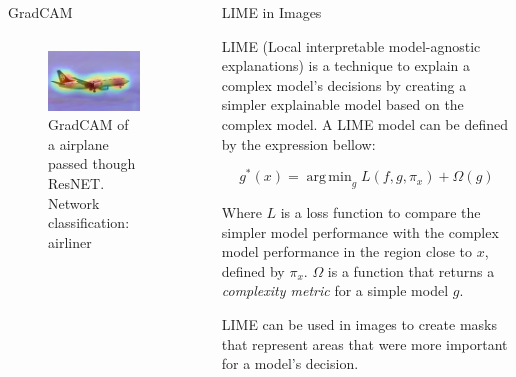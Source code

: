 \documentclass[final]{beamer}
\newlength{\sepwidth}
\newlength{\colwidth}
\newcommand{\separatorcolumn}{\begin{column}{\sepwidth}\end{column}}
\newcommand{\argmin}{\mathop{\mathrm{arg\,min}}}
\begin{document}
\begin{frame}[t]
\begin{columns}[t]
\begin{column}{\colwidth}
\begin{block}{GradCAM}
\begin{columns}
      \begin{column}{0.5\textwidth}
        \begin{figure}
          \centering
          \includegraphics[width=0.9\linewidth]{images/GC_aviao.png}
          \caption{GradCAM of a airplane passed though ResNET. Network classification: airliner}
        \end{figure}
      \end{column}
      
    \end{columns}
  \end{block}
\end{column}

\separatorcolumn

\begin{column}{\colwidth}

  \begin{block}{LIME in Images}

    LIME (Local interpretable model-agnostic explanations) is a technique to explain a complex model's decisions 
    by creating a simpler explainable model based on the complex model. A LIME model can be defined by the expression bellow:
    
    \[g^*(x) = \argmin_{g} L(f, g, \pi_x) + \Omega(g)\]
    
    Where \(L\) is a loss function to compare the simpler model performance with the complex model performance in the region close to \(x\), defined by \(\pi_x\). 
    \(\Omega\) is a function that returns a \textit{complexity metric} for a simple model \(g\).

    LIME can be used in images to create masks that represent areas that were more important for a model's decision.
    

\end{block}
\end{column}
\end{columns}
\end{frame}
\end{document}
